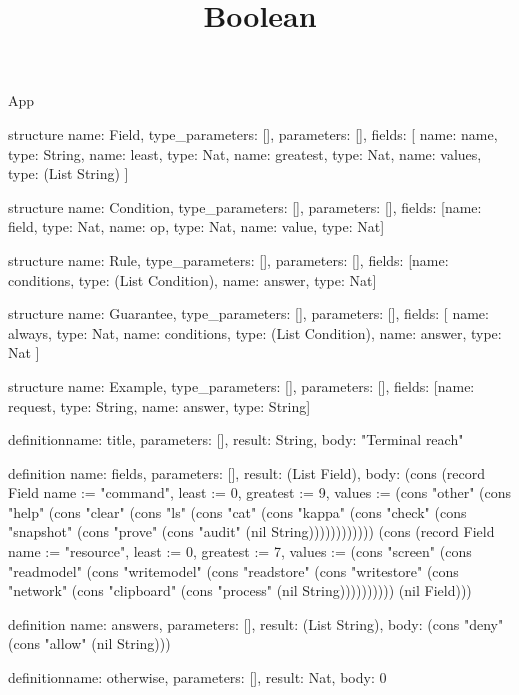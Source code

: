 \begin{lexlean}{App}
\title{Boolean}
\begin{semanticmodule}
structure{
  name: Field,
  type_parameters: [],
  parameters: [],
  fields: [
    {name: name, type: String},
    {name: least, type: Nat},
    {name: greatest, type: Nat},
    {name: values, type: (List String)}
  ]
}

structure{
  name: Condition,
  type_parameters: [],
  parameters: [],
  fields: [{name: field, type: Nat}, {name: op, type: Nat}, {name: value, type: Nat}]
}

structure{
  name: Rule,
  type_parameters: [],
  parameters: [],
  fields: [{name: conditions, type: (List Condition)}, {name: answer, type: Nat}]
}

structure{
  name: Guarantee,
  type_parameters: [],
  parameters: [],
  fields: [
    {name: always, type: Nat},
    {name: conditions, type: (List Condition)},
    {name: answer, type: Nat}
  ]
}

structure{
  name: Example,
  type_parameters: [],
  parameters: [],
  fields: [{name: request, type: String}, {name: answer, type: String}]
}

definition{name: title, parameters: [], result: String, body: "Terminal reach"}

definition{
  name: fields,
  parameters: [],
  result: (List Field),
  body: (cons (record Field {name := "command", least := 0, greatest := 9, values := (cons "other" (cons "help" (cons "clear" (cons "ls" (cons "cat" (cons "kappa" (cons "check" (cons "snapshot" (cons "prove" (cons "audit" (nil String)))))))))))}) (cons (record Field {name := "resource", least := 0, greatest := 7, values := (cons "screen" (cons "readmodel" (cons "writemodel" (cons "readstore" (cons "writestore" (cons "network" (cons "clipboard" (cons "process" (nil String)))))))))}) (nil Field)))
}

definition{
  name: answers,
  parameters: [],
  result: (List String),
  body: (cons "deny" (cons "allow" (nil String)))
}

definition{name: otherwise, parameters: [], result: Nat, body: 0}


\end{semanticmodule}
\end{lexlean}
